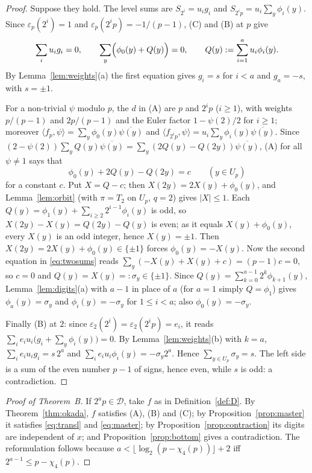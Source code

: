\documentclass[11pt,a4paper]{article}
\theoremstyle{definition}
\theoremstyle{remark}
\newcommand{\cD}{\mathcal{D}}
\newcommand{\ip}[2]{\langle #1,#2\rangle}
\begin{document}
\begin{proof}
Suppose they hold. The level sums are $S_{2^i}=u_ig_i$ and $S_{2^ip}=u_i\sum_y\phi_i(y)$. Since $\varepsilon_p(2^i)=1$ and $\varepsilon_p(2^ip)=-1/(p-1)$, (C) and (B) at $p$ give
\begin{equation}\label{eq:twosums}
\sum_iu_ig_i=0,\qquad \sum_y\Bigl(\phi_0(y)+Q(y)\Bigr)=0,\qquad Q(y):=\sum_{i=1}^au_i\phi_i(y).
\end{equation}
By Lemma~\ref{lem:weights}(a) the first equation gives $g_i=s$ for $i<a$ and $g_a=-s$, with $s=\pm1$.

For a non-trivial $\psi$ modulo $p$, the $d$ in (A) are $p$ and $2^ip$ ($i\ge1$), with weights $p/(p-1)$ and $2p/(p-1)$ and the Euler factor $1-\psi(2)/2$ for $i\ge1$; moreover $\ip{f_p}{\psi}=\sum_y\phi_0(y)\overline{\psi(y)}$ and $\ip{f_{2^ip}}{\psi}=u_i\sum_y\phi_i(y)\overline{\psi(y)}$. Since $(2-\psi(2))\sum_yQ(y)\overline{\psi(y)}=\sum_y(2Q(y)-Q(2y))\overline{\psi(y)}$, (A) for all $\psi\neq1$ says that
\[
\phi_0(y)+2Q(y)-Q(2y)=c\qquad(y\in U_p)
\]
for a constant $c$. Put $X=Q-c$; then $X(2y)=2X(y)+\phi_0(y)$, and Lemma~\ref{lem:orbit} (with $\pi=T_2$ on $U_p$, $q=2$) gives $|X|\le1$. Each $Q(y)=\phi_1(y)+\sum_{i\ge2}2^{i-1}\phi_i(y)$ is odd, so $X(2y)-X(y)=Q(2y)-Q(y)$ is even; as it equals $X(y)+\phi_0(y)$, every $X(y)$ is an odd integer, hence $X(y)=\pm1$. Then $X(2y)=2X(y)+\phi_0(y)\in\{\pm1\}$ forces $\phi_0(y)=-X(y)$. Now the second equation in \eqref{eq:twosums} reads $\sum_y(-X(y)+X(y)+c)=(p-1)c=0$, so $c=0$ and $Q(y)=X(y)=:\sigma_y\in\{\pm1\}$. Since $Q(y)=\sum_{k=0}^{a-1}2^k\phi_{k+1}(y)$, Lemma~\ref{lem:digits}(a) with $a-1$ in place of $a$ (for $a=1$ simply $Q=\phi_1$) gives $\phi_a(y)=\sigma_y$ and $\phi_i(y)=-\sigma_y$ for $1\le i<a$; also $\phi_0(y)=-\sigma_y$.

Finally (B) at $2$: since $\varepsilon_2(2^i)=\varepsilon_2(2^ip)=e_i$, it reads $\sum_ie_iu_i\bigl(g_i+\sum_y\phi_i(y)\bigr)=0$. By Lemma~\ref{lem:weights}(b) with $k=a$, $\sum_ie_iu_ig_i=s\,2^a$ and $\sum_ie_iu_i\phi_i(y)=-\sigma_y2^a$. Hence $\sum_{y\in U_p}\sigma_y=s$. The left side is a sum of the even number $p-1$ of signs, hence even, while $s$ is odd: a contradiction.
\end{proof}

\begin{proof}[Proof of Theorem~B]
If $2^ap\in\cD$, take $f$ as in Definition~\ref{def:D}. By Theorem~\ref{thm:okada}, $f$ satisfies (A), (B) and (C); by Proposition~\ref{prop:master} it satisfies \eqref{eq:transl} and \eqref{eq:master}; by Proposition~\ref{prop:contraction} its digits are independent of $x$; and Proposition~\ref{prop:bottom} gives a contradiction. The reformulation follows because $a<\lfloor\log_2(p-\chi_4(p))\rfloor+2$ iff $2^{a-1}\le p-\chi_4(p)$.
\end{proof}
\end{document}
